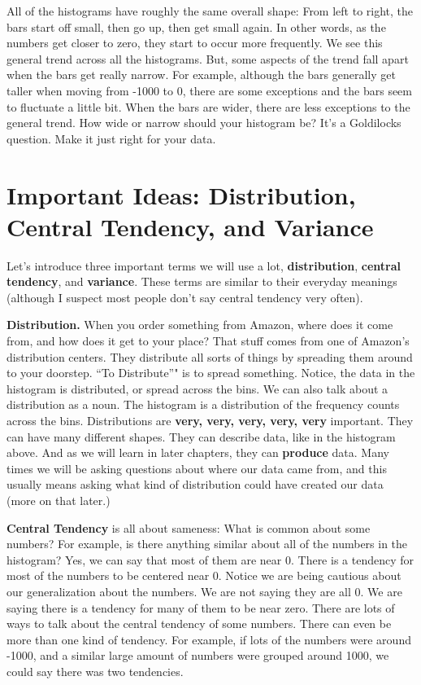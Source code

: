 \documentclass[
]{book}
\begin{document}
All of the histograms have roughly the same overall shape: From left to right, the bars start off small, then go up, then get small again. In other words, as the numbers get closer to zero, they start to occur more frequently. We see this general trend across all the histograms. But, some aspects of the trend fall apart when the bars get really narrow. For example, although the bars generally get taller when moving from -1000 to 0, there are some exceptions and the bars seem to fluctuate a little bit. When the bars are wider, there are less exceptions to the general trend. How wide or narrow should your histogram be? It's a Goldilocks question. Make it just right for your data.

\hypertarget{important-ideas-distribution-central-tendency-and-variance}{%
\section{Important Ideas: Distribution, Central Tendency, and Variance}\label{important-ideas-distribution-central-tendency-and-variance}}

Let's introduce three important terms we will use a lot, \textbf{distribution}, \textbf{central tendency}, and \textbf{variance}. These terms are similar to their everyday meanings (although I suspect most people don't say central tendency very often).

\textbf{Distribution.} When you order something from Amazon, where does it come from, and how does it get to your place? That stuff comes from one of Amazon's distribution centers. They distribute all sorts of things by spreading them around to your doorstep. ``To Distribute''" is to spread something. Notice, the data in the histogram is distributed, or spread across the bins. We can also talk about a distribution as a noun. The histogram is a distribution of the frequency counts across the bins. Distributions are \textbf{very, very, very, very, very} important. They can have many different shapes. They can describe data, like in the histogram above. And as we will learn in later chapters, they can \textbf{produce} data. Many times we will be asking questions about where our data came from, and this usually means asking what kind of distribution could have created our data (more on that later.)

\textbf{Central Tendency} is all about sameness: What is common about some numbers? For example, is there anything similar about all of the numbers in the histogram? Yes, we can say that most of them are near 0. There is a tendency for most of the numbers to be centered near 0. Notice we are being cautious about our generalization about the numbers. We are not saying they are all 0. We are saying there is a tendency for many of them to be near zero. There are lots of ways to talk about the central tendency of some numbers. There can even be more than one kind of tendency. For example, if lots of the numbers were around -1000, and a similar large amount of numbers were grouped around 1000, we could say there was two tendencies.
\end{document}
